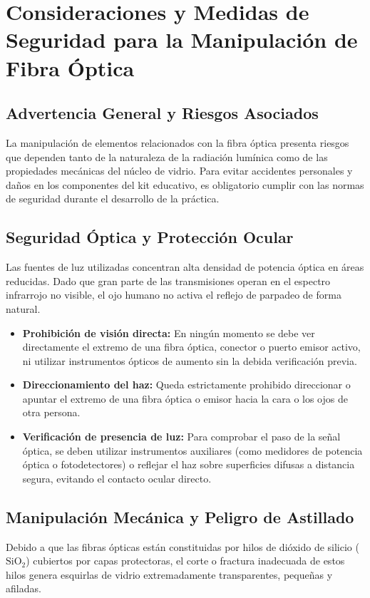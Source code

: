 \section{Consideraciones y Medidas de Seguridad para la Manipulación de Fibra Óptica}

\subsection{Advertencia General y Riesgos Asociados}
La manipulación de elementos relacionados con la fibra óptica presenta riesgos que dependen tanto de la naturaleza de la radiación lumínica como de las propiedades mecánicas del núcleo de vidrio. Para evitar accidentes personales y daños en los componentes del kit educativo, es obligatorio cumplir con las normas de seguridad durante el desarrollo de la práctica.

\subsection{Seguridad Óptica y Protección Ocular}
Las fuentes de luz utilizadas concentran alta densidad de potencia óptica en áreas reducidas. Dado que gran parte de las transmisiones operan en el espectro infrarrojo no visible, el ojo humano no activa el reflejo de parpadeo de forma natural.

\begin{itemize}
    \item \textbf{Prohibición de visión directa:} En ningún momento se debe ver directamente el extremo de una fibra óptica, conector o puerto emisor activo, ni utilizar instrumentos ópticos de aumento sin la debida verificación previa.
    
    \item \textbf{Direccionamiento del haz:} Queda estrictamente prohibido direccionar o apuntar el extremo de una fibra óptica o emisor hacia la cara o los ojos de otra persona.
    
    \item \textbf{Verificación de presencia de luz:} Para comprobar el paso de la señal óptica, se deben utilizar instrumentos auxiliares (como medidores de potencia óptica o fotodetectores) o reflejar el haz sobre superficies difusas a distancia segura, evitando el contacto ocular directo.
\end{itemize}

\subsection{Manipulación Mecánica y Peligro de Astillado}
Debido a que las fibras ópticas están constituidas por hilos de dióxido de silicio ($\text{SiO}_2$) cubiertos por capas protectoras, el corte o fractura inadecuada de estos hilos genera esquirlas de vidrio extremadamente transparentes, pequeñas y afiladas.

